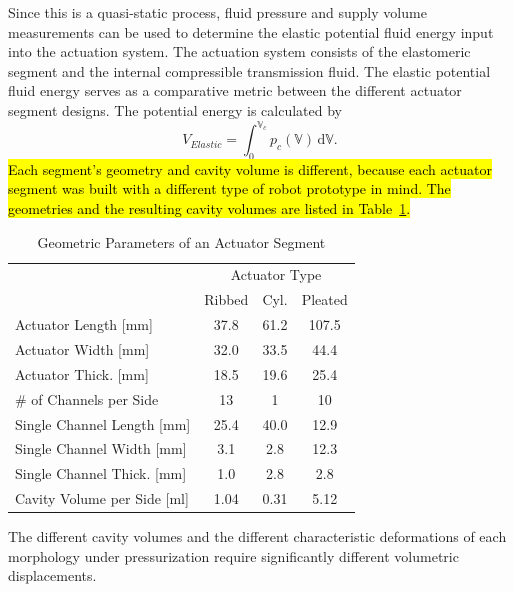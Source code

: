 Since this is a quasi-static process, fluid pressure and supply volume measurements can be used to determine the elastic potential fluid energy input into the actuation system.
%
The actuation system consists of the elastomeric segment and the internal compressible transmission fluid.
%
The elastic potential fluid energy serves as a comparative metric between the different actuator segment designs.
%
The potential energy is calculated by
\begin{equation}\label{eqn:energy}
    V_{Elastic} = \int_0^{\mathbb{V}_c} p_c\left( \mathbb{V} \right) \, \text{d} \mathbb{V}.
\end{equation}
%
\hl{Each segment's geometry and cavity volume is different, because each actuator segment was built with a different type of robot prototype in mind. The geometries and the resulting cavity volumes are listed in Table~\mbox{\ref{tab:ComparativeCharacterization}}.}
\begin{table}[htb]
\caption{Geometric Parameters of an Actuator Segment}
\centering
\begin{tabular}{l c c c}
& \multicolumn{3}{c}{Actuator Type}\\
\cline{2-4}
 & Ribbed & Cyl. & Pleated\\
\hline
Actuator Length [mm] & 37.8  & 61.2  & 107.5\\
Actuator Width [mm] & 32.0  & 33.5 & 44.4\\
Actuator Thick. [mm] & 18.5 & 19.6 & 25.4\\
\# of Channels per Side & 13 & 1 & 10\\
Single Channel Length [mm] & 25.4 & 40.0 & 12.9\\
Single Channel Width [mm] & 3.1  & 2.8 & 12.3\\
Single Channel Thick. [mm] & 1.0 & 2.8 & 2.8\\
Cavity Volume per Side [ml] & 1.04 & 0.31 & 5.12 \\
\hline
\end{tabular}
\label{tab:ComparativeCharacterization}
\end{table}
%
The different cavity volumes and the different characteristic deformations of each morphology under pressurization require significantly different volumetric displacements.

